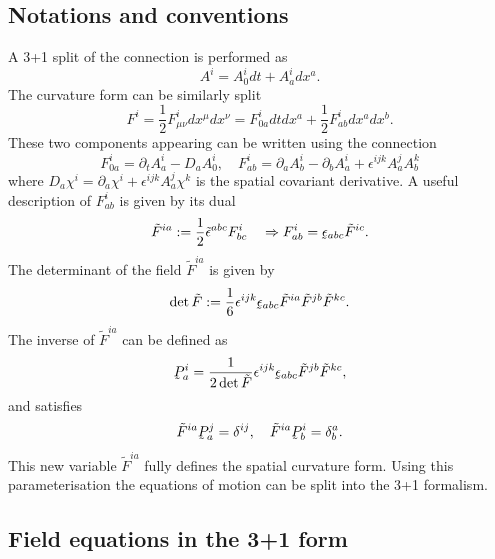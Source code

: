 \documentclass[10pt]{report}
\newcommand{\utilde}[1]{\underaccent{\tilde}{#1}}
\theoremstyle{definition}
\begin{document}
\subsection{Notations and conventions}

A 3+1 split of the connection is performed as
\begin{equation}
    A^i = A^i_0 dt + A^i_a dx^a.
\end{equation}
The curvature form can be similarly split
\begin{equation}
    F^i = \frac{1}{2}F^i_{\mu\nu} dx^\mu dx^\nu = F^i_{0a} dt dx^a + \frac{1}{2}F^i_{ab} dx^a dx^b.
\end{equation}
These two components appearing can be written using the connection
\begin{equation}\label{t-partial-A}
    F^i_{0a} = \partial_t A^i_a - D_a A^i_0, \quad F^i_{ab} = \partial_a A^i_b - \partial_b A^i_a + \epsilon^{ijk}A^j_a A^k_b
\end{equation}
where $D_a \chi^i = \partial_a \chi^i + \epsilon^{ijk} A^j_a \chi^k$ is the spatial covariant derivative. A useful description of $F^i_{ab}$ is given by its dual
\begin{equation}\label{tilde-F}
    \tilde{F}^{ia} := \frac{1}{2}\tilde{\epsilon}^{abc} F^i_{bc} \quad \Rightarrow F^i_{ab} = \utilde{\epsilon}_{abc}\tilde{F}^{ic}.
\end{equation}
The determinant of the field $\tilde{F}^{ia}$ is given by
\begin{equation}
    \det{\tilde{F}} := \frac{1}{6} \epsilon^{ijk} \utilde{\epsilon}_{abc} \tilde{F}^{ia} \tilde{F}^{jb} \tilde{F}^{kc}.
\end{equation}
The inverse of $\tilde{F}^{ia}$ can be defined as
\begin{equation}
    \utilde{P}^{i}_a = \frac{1}{2\det{\tilde{F}}}\epsilon^{ijk}\utilde{\epsilon}_{abc} \tilde{F}^{jb} \tilde{F}^{kc},
\end{equation}
and satisfies
\begin{equation}
    \tilde{F}^{ia} \utilde{P}^j_a = \delta^{ij}, \quad \tilde{F}^{ia} \utilde{P}^i_b = \delta^a_b.
\end{equation}
This new variable $\tilde{F}^{ia}$ fully defines the spatial curvature form. Using this parameterisation the equations of motion can be split into the 3+1 formalism.

\subsection{Field equations in the 3+1 form}
\end{document}
